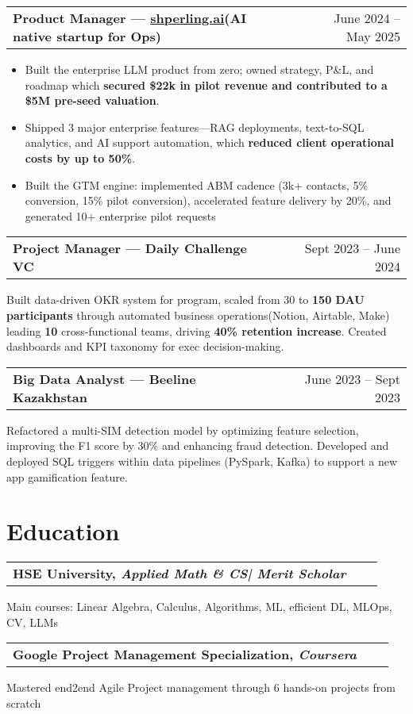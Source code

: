 \documentclass[a4paper,12pt]{article}
\makeatletter
\newenvironment{jobshort}[2]
    {
    \begin{tabularx}{\linewidth}{@{}l X r@{}}
    \textbf{#1} & \hfill &  #2 \\[0.25pt]
    \end{tabularx}
    }
    {
    }
\newenvironment{joblong}[2]
    {
    \begin{tabularx}{\linewidth}{@{}l X r@{}}
    \textbf{#1} & \hfill &  #2 \\[0.25pt]
    \end{tabularx}
    \begin{minipage}[t]{\linewidth}
    \begin{itemize}[leftmargin=1em,label=--]
    }
    {
    \end{itemize}
    \end{minipage}    
    }
\makeatother
\begin{document}
\begin{joblong}{Product Manager — \href{https://shperling.ai}{shperling.ai}(AI native startup for Ops)}{June 2024 – May 2025}
\item Built the enterprise LLM product from zero; owned strategy, P\&L, and roadmap which \textbf{secured \$22k in pilot revenue and contributed to a \$5M pre-seed valuation}.
\item Shipped 3 major enterprise features—RAG deployments, text-to-SQL analytics, and AI support automation, which \textbf{reduced client operational costs by up to 50\%}. 
\item Built the GTM engine: implemented ABM cadence (3k+ contacts, 5\% conversion, 15\% pilot conversion), accelerated feature delivery by 20\%, and generated 10+ enterprise pilot requests
\end{joblong}


\begin{jobshort}{Project Manager — Daily Challenge VC}{Sept 2023 – June 2024}
Built data-driven OKR system for program, scaled from 30 to \textbf{150 DAU participants} through automated business operations(Notion, Airtable, Make) leading \textbf{10} cross-functional teams, driving \textbf{40\% retention increase}. Created dashboards and KPI taxonomy for exec decision-making.
\end{jobshort}


\begin{jobshort}{Big Data Analyst — Beeline Kazakhstan}{June 2023 – Sept 2023}
Refactored a multi-SIM detection model by optimizing feature selection, improving the F1 score by 30\% and enhancing fraud detection. Developed and deployed SQL triggers within data pipelines (PySpark, Kafka) to support a new app gamification feature.
\end{jobshort}
\section{Education}
\begin{jobshort}{HSE University, \textit{Applied Math \& CS| Merit Scholar}}{}
\end{jobshort}
\noindent Main courses: Linear Algebra, Calculus, Algorithms, ML, efficient DL, MLOps, CV, LLMs

\begin{jobshort}{Google Project Management Specialization, \textit{Coursera}}{}
\end{jobshort}
\noindent Mastered end2end Agile Project management through 6 hands-on projects from scratch
\end{document}
